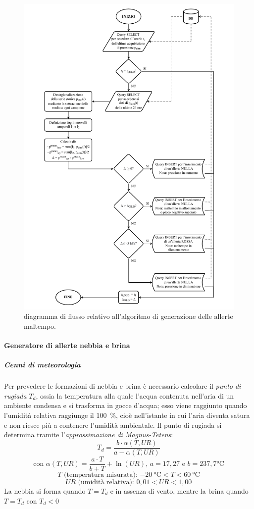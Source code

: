 \begin{figure}[h!]
	\centering
	\includegraphics[width=1\linewidth]{./Iterazione 3/OtherFiles/FC - Generatore allerte BW.pdf}
	\caption{diagramma di flusso relativo all'algoritmo di generazione delle allerte maltempo.}
	\label{fig:BFFlowChart}
\end{figure}

\paragraph{Generatore di allerte nebbia e brina}

\subparagraph{Cenni di meteorologia} Per prevedere le formazioni di nebbia e brina è necessario calcolare il \textit{punto di rugiada} $T_d$, ossia la temperatura alla quale l'acqua contenuta nell'aria di un ambiente condensa e si trasforma in gocce d'acqua; esso viene raggiunto quando l'umidità relativa raggiunge il \SI{100}{\percent}, cioè nell'istante in cui l'aria diventa satura e non riesce più a contenere l'umidità ambientale. Il punto di rugiada si determina tramite l'\textit{approssimazione di Magnus-Tetens}:
\[ T_d = \frac{b \cdot \alpha(T,UR)}{a - \alpha(T,UR)}\]
\[\mbox{con } \alpha(T,UR) = \frac{a \cdot T}{b + T} + \ln(UR) \mbox{, } a = \si{17,27} \mbox{ e } b = \si{237,7}\si{\degreeCelsius}\]
\[T\mbox{ (temperatura misurata): } \SI{-20}{\degreeCelsius} < T < \SI{60}{\degreeCelsius}\]
\[UR\mbox{ (umidità relativa): } 0,01 < UR < 1,00\]
La nebbia si forma quando $T = T_d$ e in assenza di vento, mentre la brina quando $T = T_d$ con $T_d < 0$

